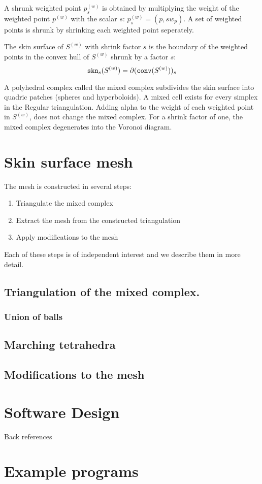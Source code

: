 A shrunk weighted point ${p}^{(w)}_{s}$ is obtained by multiplying the
weight of the weighted point ${p}^{(w)}$ with the scalar $s$:
${p}^{(w)}_{s}= (p,s w_p)$. A set of weighted points is shrunk by
shrinking each weighted point seperately.

The skin surface of ${S}^{(w)}$ with shrink factor $s$ is the boundary
of the weighted points in the convex hull of ${S}^{(w)}$ shrunk by a
factor $s$:
\[{\tt skn}_s({S}^{(w)}) =
\partial({\tt conv}({S}^{(w)}))_s\]

A polyhedral complex called the mixed complex subdivides the skin
surface into quadric patches (spheres and hyperboloids). A mixed cell
exists for every simplex in the Regular triangulation. Adding alpha to
the weight of each weighted point in $S^{(w)}$, does not change the
mixed complex. For a shrink factor of one, the mixed complex
degenerates into the Voronoi diagram.

\section{Skin surface mesh}
The mesh is constructed in several steps:
\begin{enumerate}
\item Triangulate the mixed complex
\item Extract the mesh from the constructed triangulation
\item Apply modifications to the mesh
\end{enumerate}
Each of these steps is of independent interest and we describe them in
more detail.

\subsection{Triangulation of the mixed complex.}

\subsubsection{Union of balls}

\subsection{Marching tetrahedra}
\subsection{Modifications to the mesh}

\section{Software Design}
Back references
\section{Example programs}


